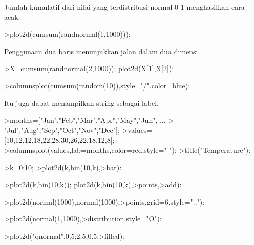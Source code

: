 \documentclass{article}
\begin{document}
\begin{eulernotebook}
\begin{eulercomment}
\begin{eulercomment}
\begin{eulercomment}
\begin{eulercomment}
\begin{eulercomment}
Jumlah kumulatif dari nilai yang terdistribusi normal 0-1 menghasilkan
cara acak.
\end{eulercomment}
\begin{eulerprompt}
>plot2d(cumsum(randnormal(1,1000))):
\end{eulerprompt}
\begin{eulercomment}
Penggunaan dua baris menunjukkan jalan dalam dua dimensi.
\end{eulercomment}
\begin{eulerprompt}
>X=cumsum(randnormal(2,1000)); plot2d(X[1],X[2]):
\end{eulerprompt}
\begin{eulerprompt}
>columnsplot(cumsum(random(10)),style="/",color=blue):
\end{eulerprompt}
\begin{eulercomment}
Itu juga dapat menampilkan string sebagai label.
\end{eulercomment}
\begin{eulerprompt}
>months=["Jan","Feb","Mar","Apr","May","Jun", ...
>  "Jul","Aug","Sep","Oct","Nov","Dec"];
>values=[10,12,12,18,22,28,30,26,22,18,12,8];
>columnsplot(values,lab=months,color=red,style="-");
>title("Temperature"):
\end{eulerprompt}
\begin{eulerprompt}
>k=0:10;
>plot2d(k,bin(10,k),>bar):
\end{eulerprompt}
\begin{eulerprompt}
>plot2d(k,bin(10,k)); plot2d(k,bin(10,k),>points,>add):
\end{eulerprompt}
\begin{eulerprompt}
>plot2d(normal(1000),normal(1000),>points,grid=6,style=".."):
\end{eulerprompt}
\begin{eulerprompt}
>plot2d(normal(1,1000),>distribution,style="O"):
\end{eulerprompt}
\begin{eulerprompt}
>plot2d("qnormal",0,5;2.5,0.5,>filled):

\end{eulerprompt}
\end{eulercomment}
\end{eulercomment}
\end{eulercomment}
\end{eulercomment}
\end{eulernotebook}
\end{document}
